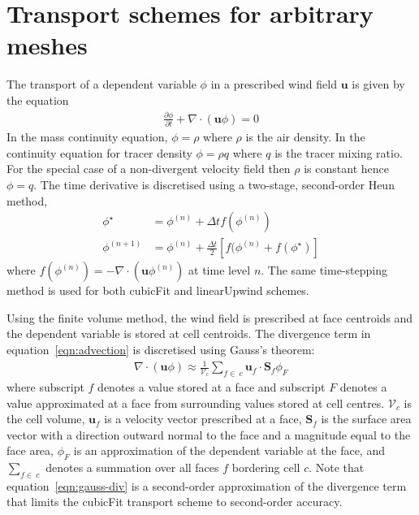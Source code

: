 \section{Transport schemes for arbitrary meshes}
\label{sec:transport}

The transport of a dependent variable $\phi$ in a prescribed wind field $\mathbf{u}$ is given by the equation
\begin{align}
	\frac{\partial \phi}{\partial t} + \nabla \cdot \left( \mathbf{u} \phi \right) = 0 \label{eqn:advection}
\end{align}
In the mass continuity equation, $\phi = \rho$ where $\rho$ is the air density.  In the continuity equation for tracer density $\phi = \rho q$ where $q$ is the tracer mixing ratio.  For the special case of a non-divergent velocity field then $\rho$ is constant hence $\phi = q$.
The time derivative is discretised using a two-stage, second-order Heun method,
\begin{subequations}
\begin{align}
	\phi^\star &= \phi^{(n)} + \Delta t f(\phi^{(n)}) \\
	\phi^{(n+1)} &= \phi^{(n)} + \frac{\Delta t}{2} \left[ f(\phi^{(n)} + f(\phi^{\star}) \right]
\end{align}
\end{subequations}
where \(f(\phi^{(n)}) = - \nabla \cdot (\mathbf{u} \phi^{(n)})\) at time level \(n\).  The same time-stepping method is used for both cubicFit and linearUpwind schemes.

Using the finite volume method, the wind field is prescribed at face centroids and the dependent variable is stored at cell centroids.  The divergence term in equation~\eqref{eqn:advection} is discretised using Gauss's theorem:
\begin{align}
	\nabla \cdot \left( \mathbf{u} \phi \right) \approx \frac{1}{\mathcal{V}_c} \sum_{f \in\:c} \mathbf{u}_f \cdot \mathbf{S}_f \phi_F \label{eqn:gauss-div}
\end{align}
where subscript $f$ denotes a value stored at a face and subscript $F$ denotes a value approximated at a face from surrounding values stored at cell centres.  $\mathcal{V}_c$ is the cell volume, $\mathbf{u}_f$ is a velocity vector prescribed at a face, ${\mathbf{S}_f}$ is the surface area vector with a direction outward normal to the face and a magnitude equal to the face area, $\phi_F$ is an approximation of the dependent variable at the face, and $\sum_{f \in\:c}$ denotes a summation over all faces $f$ bordering cell $c$.
Note that equation~\eqref{eqn:gauss-div} is a second-order approximation of the divergence term that limits the cubicFit transport scheme to second-order accuracy.

